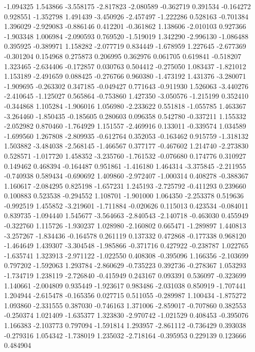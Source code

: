 -1.094325
1.543866
-3.558175
-2.817823
-2.080589
-0.362719
0.391534
-0.164272
0.928551
-1.352798
1.491439
-3.450926
-2.457497
-1.222286
0.528163
-0.701384
1.396029
-2.929083
-0.886146
0.412201
-0.361862
1.138606
-2.010103
0.927366
-1.903348
1.006984
-2.090593
0.769520
-1.519019
1.342290
-2.996130
-1.086488
0.395925
-0.389971
1.158282
-2.077719
0.834449
-1.678959
1.227645
-2.677369
-0.301204
0.154968
0.275873
0.206995
0.362976
0.061705
0.619841
-0.518207
1.323465
-2.634406
-0.172857
0.030763
0.504412
-0.275050
1.083437
-1.821012
1.153189
-2.491659
0.088425
-0.276766
0.960380
-1.473192
1.431376
-3.280071
-1.909695
-0.263302
0.347185
-0.049427
0.771643
-0.911930
1.526063
-3.440276
-2.410645
-1.125027
0.565864
-0.753860
1.427350
-3.050576
-1.215199
0.352410
-0.344868
1.105284
-1.906016
1.056980
-2.233622
0.551818
-1.055785
1.463367
-3.264460
-1.850435
-0.185605
0.280603
0.096358
0.542780
-0.337211
1.155332
-2.052982
0.870460
-1.764929
1.151557
-2.469916
0.133011
-0.339574
1.034589
-1.699560
1.267808
-2.809935
-0.612764
0.352053
-0.163462
0.915759
-1.318132
1.503882
-3.484038
-2.568145
-1.466567
0.377177
-0.467602
1.214740
-2.273830
0.528571
-1.017720
1.458352
-3.235760
-1.761532
-0.076680
0.174776
0.310927
0.149462
0.468394
-0.164487
0.951861
-1.416180
1.464314
-3.375845
-2.211955
-0.740938
0.589434
-0.690692
1.409860
-2.972407
-1.000314
0.408278
-0.388367
1.160617
-2.084295
0.825198
-1.657231
1.245193
-2.725792
-0.411293
0.239660
0.100883
0.523538
-0.294552
1.108701
-1.901000
1.064350
-2.253378
0.519636
-0.992519
1.455852
-3.219601
-1.711884
-0.020626
0.115013
0.423534
-0.084011
0.839735
-1.094440
1.545677
-3.564663
-2.840543
-2.140718
-0.463030
0.455949
-0.322760
1.115726
-1.930237
1.028980
-2.160802
0.665471
-1.289897
1.440813
-3.257267
-1.834436
-0.164578
0.261119
0.137332
0.472868
-0.177338
0.968120
-1.464649
1.439307
-3.304548
-1.985866
-0.371716
0.427922
-0.238787
1.022765
-1.635741
1.323913
-2.971122
-1.022550
0.408308
-0.395096
1.166356
-2.103699
0.797202
-1.592063
1.293784
-2.860629
-0.735223
0.392736
-0.278367
1.053293
-1.734719
1.238119
-2.726840
-0.415949
0.243167
0.093391
0.536097
-0.323699
1.140661
-2.004809
0.935449
-1.923617
0.983486
-2.031038
0.850919
-1.707441
1.204944
-2.615478
-0.165356
0.027715
0.511055
-0.289987
1.100434
-1.875272
1.093860
-2.331555
0.387030
-0.746163
1.371006
-2.859017
-0.707860
0.382553
-0.250374
1.021409
-1.635377
1.323830
-2.970742
-1.021529
0.408453
-0.395076
1.166383
-2.103773
0.797094
-1.591814
1.293957
-2.861112
-0.736429
0.393038
-0.279316
1.054342
-1.738019
1.235032
-2.718164
-0.395953
0.229139
0.123666
0.484904
